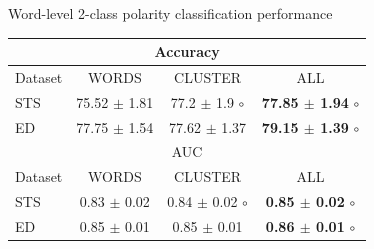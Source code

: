 \documentclass[handout]{beamer}
\begin{document}
\begin{frame}{Word-level 2-class polarity classification performance}
\begin{scriptsize}
\begin{table}[!htb]
\scriptsize
\begin{center}
\begin{tabular}{l|c|c|c}
\hline \hline
\multicolumn{ 4}{c}{Accuracy } \\ \hline \hline
Dataset & WORDS & CLUSTER & ALL \\ \hline
STS & 75.52 $\pm$ 1.81 & 77.2 $\pm$ 1.9 $\circ$ & \textbf{77.85 $\pm$ 1.94} $\circ$ \\ 
ED  & 77.75 $\pm$ 1.54 & 77.62 $\pm$ 1.37 & \textbf{79.15 $\pm$ 1.39} $\circ$ \\ 
\hline \hline
\multicolumn{ 4}{c}{AUC} \\ \hline \hline
Dataset & WORDS & CLUSTER & ALL \\ \hline
STS & 0.83 $\pm$ 0.02 & 0.84 $\pm$ 0.02 $\circ$ & \textbf{0.85 $\pm$ 0.02} $\circ$ \\
ED  & 0.85 $\pm$ 0.01 & 0.85 $\pm$ 0.01 & \textbf{0.86 $\pm$ 0.01} $\circ$ \\ 
 \hline
\end{tabular}
\end{center}
\end{table}
\end{scriptsize}
\end{frame}
\end{document}
